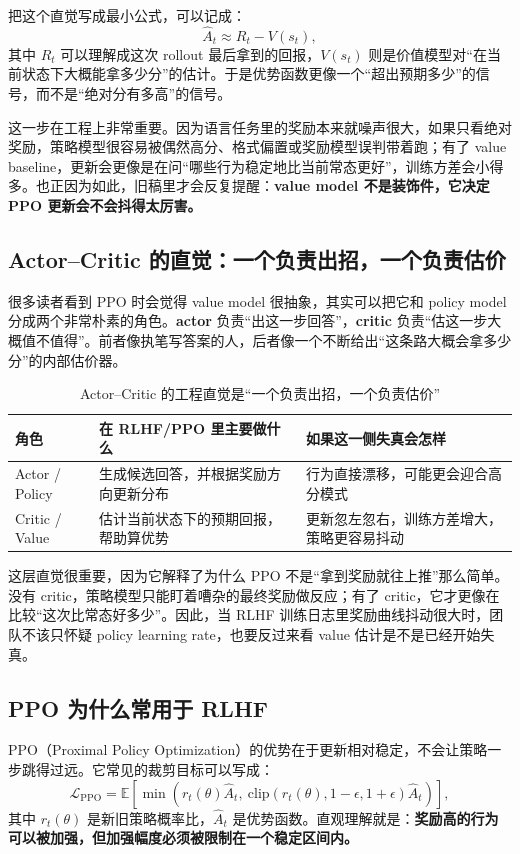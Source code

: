 把这个直觉写成最小公式，可以记成：
\[
\hat{A}_t \approx R_t - V(s_t),
\]
其中 \(R_t\) 可以理解成这次 rollout 最后拿到的回报，\(V(s_t)\) 则是价值模型对“在当前状态下大概能拿多少分”的估计。于是优势函数更像一个“超出预期多少”的信号，而不是“绝对分有多高”的信号。

这一步在工程上非常重要。因为语言任务里的奖励本来就噪声很大，如果只看绝对奖励，策略模型很容易被偶然高分、格式偏置或奖励模型误判带着跑；有了 value baseline，更新会更像是在问“哪些行为稳定地比当前常态更好”，训练方差会小得多。也正因为如此，旧稿里才会反复提醒：\textbf{value model 不是装饰件，它决定 PPO 更新会不会抖得太厉害。}

\subsection{Actor--Critic 的直觉：一个负责出招，一个负责估价}
很多读者看到 PPO 时会觉得 value model 很抽象，其实可以把它和 policy model 分成两个非常朴素的角色。\textbf{actor} 负责“出这一步回答”，\textbf{critic} 负责“估这一步大概值不值得”。前者像执笔写答案的人，后者像一个不断给出“这条路大概会拿多少分”的内部估价器。

\begin{table}[H]
\centering
\small
\begin{tabularx}{\textwidth}{>{\raggedright\arraybackslash}p{2.4cm}>{\raggedright\arraybackslash}p{3.2cm}>{\raggedright\arraybackslash}X}
\toprule
\textbf{角色} & \textbf{在 RLHF/PPO 里主要做什么} & \textbf{如果这一侧失真会怎样} \\
\midrule
Actor / Policy & 生成候选回答，并根据奖励方向更新分布 & 行为直接漂移，可能更会迎合高分模式 \\
Critic / Value & 估计当前状态下的预期回报，帮助算优势 & 更新忽左忽右，训练方差增大，策略更容易抖动 \\
\bottomrule
\end{tabularx}
\caption{Actor--Critic 的工程直觉是“一个负责出招，一个负责估价”}
\label{tab:actor-critic-intuition}
\end{table}

这层直觉很重要，因为它解释了为什么 PPO 不是“拿到奖励就往上推”那么简单。没有 critic，策略模型只能盯着嘈杂的最终奖励做反应；有了 critic，它才更像在比较“这次比常态好多少”。因此，当 RLHF 训练日志里奖励曲线抖动很大时，团队不该只怀疑 policy learning rate，也要反过来看 value 估计是不是已经开始失真。

\subsection{PPO 为什么常用于 RLHF}
PPO（Proximal Policy Optimization）的优势在于更新相对稳定，不会让策略一步跳得过远。它常见的裁剪目标可以写成：
\[
\mathcal{L}_{\mathrm{PPO}} = \mathbb{E}\left[\min\left(r_t(\theta)\hat{A}_t,\ \mathrm{clip}(r_t(\theta),1-\epsilon,1+\epsilon)\hat{A}_t\right)\right],
\]
其中 \(r_t(\theta)\) 是新旧策略概率比，\(\hat{A}_t\) 是优势函数。直观理解就是：\textbf{奖励高的行为可以被加强，但加强幅度必须被限制在一个稳定区间内。}

